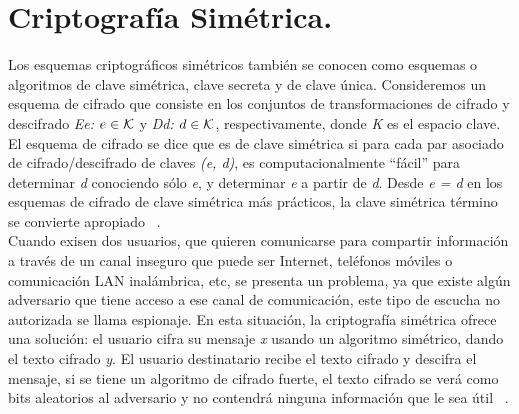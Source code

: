 

\section{Criptografía Simétrica. }
Los esquemas criptográficos simétricos también se conocen como esquemas o algoritmos de clave simétrica, clave secreta y de clave única. Consideremos un esquema de cifrado que consiste en los conjuntos de transformaciones de cifrado y descifrado \textit{Ee: $e \in {\cal K}$} y \textit{Dd: $d \in {\cal K}$}, respectivamente, donde \textit{K} es el espacio clave. El esquema de cifrado se dice que es de clave simétrica si para cada par asociado de cifrado/descifrado de claves \textit{(e, d)}, es computacionalmente “fácil” para determinar \textit{d} conociendo sólo \textit{e}, y determinar \textit{e} a partir de \textit{d}. Desde\textit{ e = d} en los esquemas de cifrado de clave simétrica más prácticos, la clave simétrica término se convierte apropiado ~\cite{menezes}.
\\
Cuando exisen dos usuarios, que quieren comunicarse para compartir información a través de un canal inseguro que puede ser Internet, teléfonos móviles o comunicación LAN inalámbrica, etc, se presenta un problema, ya que existe algún adversario que tiene acceso a ese canal de comunicación, este tipo de escucha no autorizada se llama espionaje. En esta situación, la criptografía simétrica ofrece una solución: el usuario cifra su mensaje \textit{x} usando un algoritmo simétrico, dando el texto cifrado \textit{y}. El usuario destinatario recibe el texto cifrado y descifra el mensaje, si se tiene un algoritmo de cifrado fuerte, el texto cifrado se verá como bits aleatorios al adversario y no contendrá ninguna información que le sea útil ~\cite{paar}.


